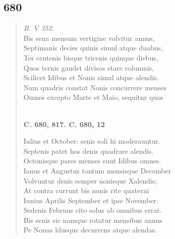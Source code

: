 \documentclass[11pt, a4paper]{report}
\begin{document}
            \subsection*{680}
      \begin{verse}
      \textit{B. V 352.} \\ Bis sena mensum vertigine volvitur annus, \\ Septimanis decies quinis simul atque duabus, \\ Ter centenis bisque tricenis quinque diebus, \\ Quos ternis gaudet divisos stare columnis, \\ Scilicet Idibus et Nonis simul atque alendis. \\ Nam quadris constat Nonis concurrere menses \\ Omnes excepto Marte et Maio, sequitnr quos \\ 
        ﻿\pagebreak 
     \marginpar{[156]} \begin{center} \textbf{C. 680, 817. C. 680, 12} \end{center}Iulius et October: senis soli hi moderauntur. \\ Septenis patet hos denis quadrare alendis. \\ Octonisque pares menses sunt Idibus omnes. \\ Ianus et Angustus tantum mensisque December \\ Volvuntur denis semper nonisque Xalendis; \\ At contra currunt bis nonis rite quaterni \\ Iunius Aprilis September et ipse November. \\ Sedenis Februus cito solus ab omnibus errat. \\ Bis senis sic namque rotatur mensibus annus \\ Pe Nonas ldusque decurrens atque alendas. \\ 
      \end{verse}
  
\end{document}
